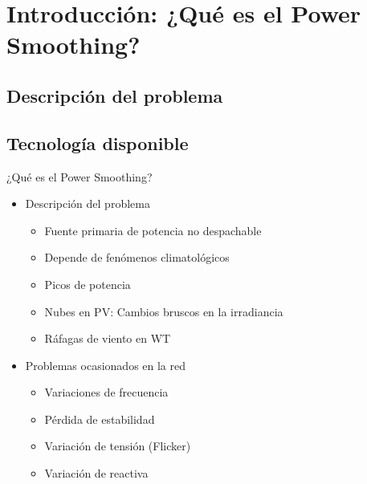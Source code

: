 \section[Introducción]{Introducción: ¿Qué es el Power Smoothing?}
\subsection[]{Descripción del problema}
\subsection[]{Tecnología disponible}
%
%
\begin{frame}{¿Qué es el Power Smoothing?}
\begin{itemize}
    \item Descripción del problema \\[1ex]
    \begin{itemize}
        \item Fuente primaria de potencia no despachable \\[1ex]
        \item Depende de fenómenos climatológicos \\[1ex]
        \item Picos de potencia \\[1ex]
        \item Nubes en PV: Cambios bruscos en la irradiancia \\[1ex]
        \item Ráfagas de viento en WT \\[2ex]
    \end{itemize}{}
    \item Problemas ocasionados en la red \\[1ex]
    \begin{itemize}
        \item Variaciones de frecuencia \\[1ex]
        \item Pérdida de estabilidad  \\[1ex]
        \item Variación de tensión (Flicker)  \\[1ex]
        \item Variación de reactiva
    \end{itemize}
\end{itemize}
\end{frame}

